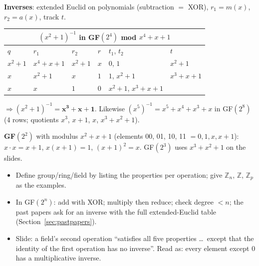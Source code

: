 \textbf{Inverses}: extended Euclid on polynomials (subtraction $=$ XOR), $r_1 = m(x)$, $r_2 = a(x)$, track $t$.
\begin{center}\small
\begin{tabular}{@{}llllll@{}}
\multicolumn{6}{c}{$(x^2 + 1)^{-1}$ in GF$(2^4)$ mod $x^4 + x + 1$}\\
\toprule
$q$ & $r_1$ & $r_2$ & $r$ & $t_1$, $t_2$ & $t$\\
\midrule
$x^2 + 1$ & $x^4 + x + 1$ & $x^2 + 1$ & $x$ & $0$, $1$ & $x^2 + 1$\\
$x$ & $x^2 + 1$ & $x$ & $1$ & $1$, $x^2 + 1$ & $x^3 + x + 1$\\
$x$ & $x$ & $1$ & $0$ & $x^2 + 1$, $x^3 + x + 1$ & \\
\bottomrule
\end{tabular}
\end{center}
$\Rightarrow (x^2 + 1)^{-1} = \mathbf{x^3 + x + 1}$. Likewise $(x^5)^{-1} = x^5 + x^4 + x^3 + x$ in GF$(2^8)$ (4 rows; quotients $x^3$, $x + 1$, $x$, $x^3 + x^2 + 1$).

\textbf{GF$(2^2)$} with modulus $x^2 + x + 1$ (elements 00, 01, 10, 11 $= 0, 1, x, x+1$): $x \cdot x = x + 1$, \;$x(x + 1) = 1$, \;$(x+1)^2 = x$. GF$(2^3)$ uses $x^3 + x^2 + 1$ on the slides.

\begin{examtip}
\begin{itemize}
  \item Define group/ring/field by listing the properties per operation; give $\mathbb{Z}_n$, $\mathbb{Z}$, $\mathbb{Z}_p$ as the examples.
  \item In GF$(2^n)$: add with XOR; multiply then reduce; check degree $< n$; the past papers ask for an inverse with the full extended-Euclid table (Section~\ref{sec:pastpapers}).
\end{itemize}
\end{examtip}

\begin{fixbox}
\begin{itemize}
  \item Slide: a field's second operation ``satisfies all five properties \dots\ except that the identity of the first operation has no inverse''. Read as: every element except 0 has a multiplicative inverse.
\end{itemize}
\end{fixbox}
